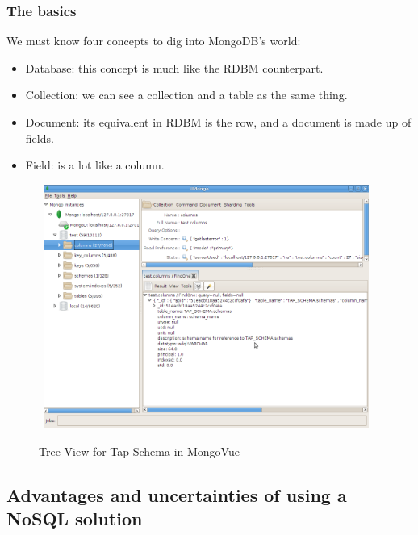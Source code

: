 

\subsubsection{The basics}

We must know four concepts to dig into MongoDB's world:

\begin{itemize}
\item Database: this concept is much like the RDBM counterpart.
\item Collection: we can see a collection and a table as the same thing.
\item Document: its equivalent in RDBM is the row, and a document is made up of fields.
\item Field: is a lot like a column.
\end{itemize}


\begin{figure}[H]
\centering
\includegraphics[width=11cm,height=8cm]{images/mongo_dia.png}\\
\caption{Tree View for Tap Schema in MongoVue}
\end{figure}


\subsection{Advantages and uncertainties of using a NoSQL solution}

